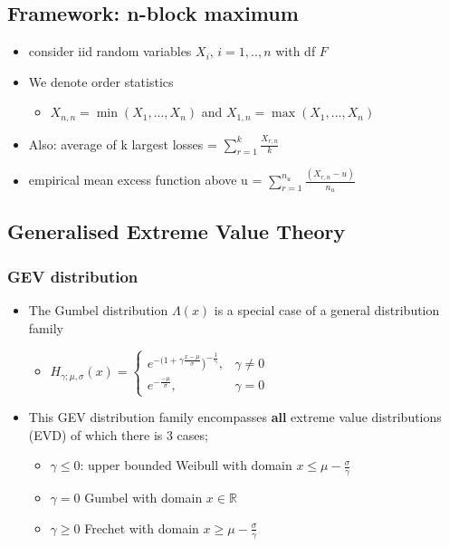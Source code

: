 \documentclass{article}
\begin{document}
\subsection{Framework: n-block maximum}

\begin{itemize}
    \item consider iid random variables $X_i, \, i = 1,.., n$ with df $F$
    \item We denote order statistics
    \begin{itemize}
        \item $X_{n,n} = \min(X_1,...,X_n)$ and $X_{1,n} = \max(X_1,...,X_n)$
    \end{itemize}
    \item Also: average of k largest losses = $\sum_{r = 1}^k \frac{X_{r,n}}{k}$
    \item empirical mean excess function above u = $\sum_{r=1}^{n_u} \frac{(X_{r,n} - u)}{n_u}$
\end{itemize}



\subsection{Generalised Extreme Value Theory}

\subsubsection{GEV distribution}

\begin{itemize}
    \item The Gumbel distribution $\Lambda(x)$ is a special case of a general distribution family
    \begin{itemize}
        \item $H_{\gamma;\mu,\sigma}(x) = \begin{cases}
            e^{-(1+\gamma \frac{x-\mu}{\sigma}})^{-\frac{1}{\gamma}}, & \gamma \neq 0\\
            e^{-\frac{-\mu}{\sigma}}, & \gamma = 0
        \end{cases}$
    \end{itemize}
    \item This GEV distribution family encompasses \textbf{all} extreme value distributions (EVD) of which there is 3 cases;
    \begin{itemize}
        \item $\gamma \leq 0$: upper bounded Weibull with domain $x \leq \mu - \frac{\sigma}{\gamma}$
        \item $\gamma = 0$ Gumbel with domain $x \in \mathbb{R}$
        \item $\gamma \geq 0 $ Frechet with domain $x \geq  \mu - \frac{\sigma}{\gamma}$
    \end{itemize}
\end{itemize}
\end{document}
